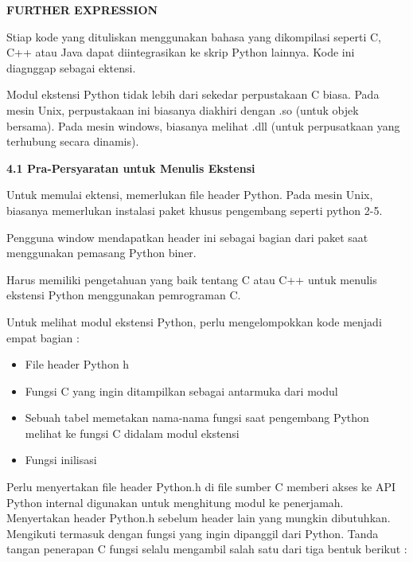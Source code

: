 \begin{center}{\fontsize{14pt}{14pt}\selectfont \textbf{FURTHER EXPRESSION} \\}\end{center} 
\vspace{14pt}

 \hspace*{0.5in} Stiap kode yang dituliskan menggunakan bahasa yang dikompilasi seperti C, C++ atau Java dapat diintegrasikan ke skrip Python lainnya. Kode ini diagnggap sebagai ektensi. 

 \hspace*{0.5in} Modul ekstensi Python tidak lebih dari sekedar perpustakaan C biasa. Pada mesin Unix, perpustakaan ini biasanya diakhiri dengan .so (untuk objek bersama). Pada mesin windows, biasanya melihat .dll (untuk perpusatkaan yang terhubung secara dinamis).  
\vspace{12pt}

\textbf{4.1 Pra-Persyaratan untuk Menulis Ekstensi} 

 \hspace*{0.5in} Untuk memulai ektensi, memerlukan file header Python. Pada mesin Unix, biasanya memerlukan instalasi paket khusus pengembang seperti python 2-5. 

 \hspace*{0.5in} Pengguna window mendapatkan header ini sebagai bagian dari paket saat menggunakan pemasang Python biner. 

 \hspace*{0.5in} Harus memiliki pengetahuan yang baik tentang C atau C++ untuk menulis ekstensi Python menggunakan pemrograman C. 
 
 \hspace*{0.5in} Untuk melihat modul ekstensi Python, perlu mengelompokkan kode menjadi empat bagian : 

\begin{itemize}
\item File header Python h 

\item Fungsi C yang ingin ditampilkan sebagai antarmuka dari modul 
 
\item Sebuah tabel memetakan nama-nama fungsi saat pengembang Python melihat ke fungsi C didalam modul ekstensi 

\item Fungsi inilisasi\end{itemize}
 
\vspace{12pt}
Perlu menyertakan file header Python.h di file sumber C memberi akses ke API Python internal digunakan untuk menghitung modul ke penerjamah. 
Menyertakan header Python.h sebelum header lain yang mungkin dibutuhkan. Mengikuti termasuk dengan fungsi yang ingin dipanggil dari Python. 
Tanda tangan penerapan C fungsi selalu mengambil salah satu dari tiga bentuk berikut : 

